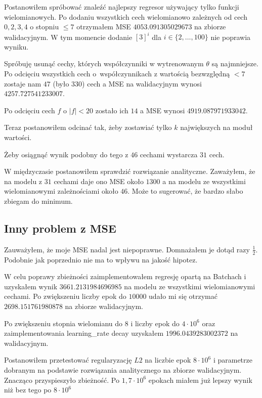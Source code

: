 \documentclass{article}
\begin{document}
  Postanowiłem spróbować znaleźć najlepszy regresor używający tylko funkcji wielomianowych. 
  Po dodaniu wszystkich cech wielomianowo zależnych od cech $0,2,3,4$ o stopniu $\le 7$ otrzymałem MSE $4053.091305029673$ na zbiorze walidacyjnym.
  W tym momencie dodanie $[3]^i$ dla $i\in\{2,\ldots, 100\}$ nie poprawia wyniku.

  Spróbuję usunąć cechy, których współczynniki w wytrenowanym $\theta$ są najmniejsze. 
  Po odcięciu wszystkich cech o~współczynnikach z wartością bezwzględną $<7$ zostaje nam $47$ (było $330$) cech a MSE na walidacyjnym wynosi $4257.727541233007$.

  Po odcięciu cech $f$ o $|f| < 20$ zostało ich $14$ a MSE wynosi $4919.087971933042$.

  Teraz postanowiłem odcinać tak, żeby zostawiać tylko $k$ największych na moduł wartości.

  Żeby osiągnąć wynik podobny do tego z $46$ cechami wystarcza $31$ cech. 

  W międzyczasie postanowiłem sprawdzić rozwiązanie analityczne. Zaważyłem, że na modelu z $31$ cechami daje ono MSE około $1300$ 
  a na modelu ze wszystkimi wielomianowymi zależnościami około $46$. Może to sugerować, że bardzo słabo zbiegam do minimum.

  \subsection{Inny problem z MSE}
  Zauważyłem, że moje MSE nadal jest niepoprawne. Domnażałem je dotąd razy $\frac{1}{2}$. Podobnie jak poprzednio nie ma to wpływu na jakość hipotez.
  
  \vspace{5pt}

  W celu poprawy zbieżności zaimplementowałem regresję opartą na Batchach i uzyskałem wynik $3661.2131984696985$ na modelu ze wszystkimi wielomianowymi cechami.
  Po zwiększeniu liczby epok do $10000$ udało mi się otrzymać $2698.151761980878$ na zbiorze walidacyjnym.

  Po zwiększeniu stopnia wielomianu do $8$ i liczby epok do $4\cdot 10^6$ oraz 
  zaimplementowania learning\_rate decay uzyskałem $1996.0439283002372$ na walidacyjnym.

  Postanowiłem przetestować regularyzację $L2$ na liczbie epok $8\cdot 10^6$ i parametrze dobranym na podstawie rozwiązania analitycznego na zbiorze walidacyjnym. Znacząco przyspieszyło zbieżność. 
  Po $1,7\cdot 10^6$ epokach miałem już lepszy wynik niż bez tego po $8\cdot 10^6$
\end{document}
